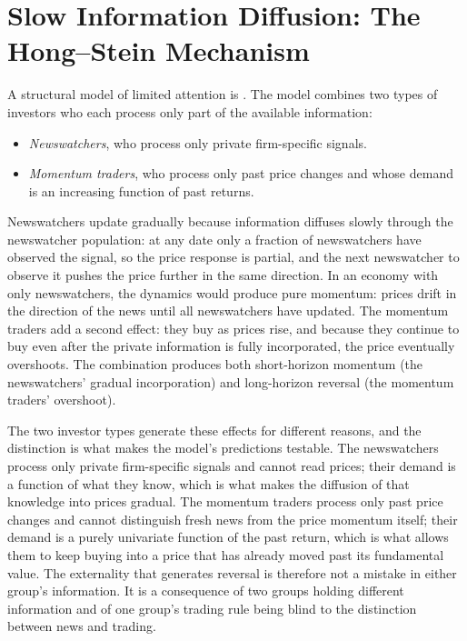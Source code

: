 \section{Slow Information Diffusion: The Hong--Stein Mechanism}
\label{sec:att3}

A structural model of limited attention is \citet{hong1999}. The model combines two types of investors who each process only part of the available information:
\begin{itemize}
\item \emph{Newswatchers}, who process only private firm-specific signals.
\item \emph{Momentum traders}, who process only past price changes and whose demand is an increasing function of past returns.
\end{itemize}
Newswatchers update gradually because information diffuses slowly through the newswatcher population: at any date only a fraction of newswatchers have observed the signal, so the price response is partial, and the next newswatcher to observe it pushes the price further in the same direction. In an economy with only newswatchers, the dynamics would produce pure momentum: prices drift in the direction of the news until all newswatchers have updated. The momentum traders add a second effect: they buy as prices rise, and because they continue to buy even after the private information is fully incorporated, the price eventually overshoots. The combination produces both short-horizon momentum (the newswatchers' gradual incorporation) and long-horizon reversal (the momentum traders' overshoot).

The two investor types generate these effects for different reasons, and the distinction is what makes the model's predictions testable. The newswatchers process only private firm-specific signals and cannot read prices; their demand is a function of what they know, which is what makes the diffusion of that knowledge into prices gradual. The momentum traders process only past price changes and cannot distinguish fresh news from the price momentum itself; their demand is a purely univariate function of the past return, which is what allows them to keep buying into a price that has already moved past its fundamental value. The externality that generates reversal is therefore not a mistake in either group's information. It is a consequence of two groups holding different information and of one group's trading rule being blind to the distinction between news and trading.

